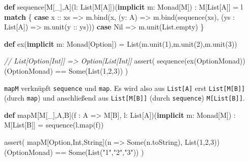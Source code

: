 \documentclass[]{article}
\newenvironment{Shaded}{}{}
\newcommand{\CommentTok}[1]{\textcolor[rgb]{0.38,0.63,0.69}{\textit{#1}}}
\newcommand{\DecValTok}[1]{\textcolor[rgb]{0.25,0.63,0.44}{#1}}
\newcommand{\FunctionTok}[1]{\textcolor[rgb]{0.02,0.16,0.49}{#1}}
\newcommand{\KeywordTok}[1]{\textcolor[rgb]{0.00,0.44,0.13}{\textbf{#1}}}
\newcommand{\NormalTok}[1]{#1}
\newcommand{\StringTok}[1]{\textcolor[rgb]{0.25,0.44,0.63}{#1}}
\begin{document}
\begin{Shaded}
\begin{Highlighting}[]
\KeywordTok{def}\NormalTok{ sequence[M[\_],A](l: List[M[A]])(}\KeywordTok{implicit}\NormalTok{ m: Monad[M]) : M[List[A]] = l }\KeywordTok{match}\NormalTok{ \{}
  \KeywordTok{case}\NormalTok{ x :: xs =\textgreater{} }
\NormalTok{      m.}\FunctionTok{bind}\NormalTok{(x, (y: A) =\textgreater{} }
\NormalTok{        m.}\FunctionTok{bind}\NormalTok{(}\FunctionTok{sequence}\NormalTok{(xs), (ys : List[A]) =\textgreater{}}
\NormalTok{          m.}\FunctionTok{unit}\NormalTok{(y :: ys)))}
  \KeywordTok{case}\NormalTok{ Nil =\textgreater{} m.}\FunctionTok{unit}\NormalTok{(List.}\FunctionTok{empty}\NormalTok{)}
\NormalTok{\}}

\KeywordTok{def} \FunctionTok{ex}\NormalTok{(}\KeywordTok{implicit}\NormalTok{ m: Monad[Option]) =}
\NormalTok{  List(m.}\FunctionTok{unit}\NormalTok{(}\DecValTok{1}\NormalTok{),m.}\FunctionTok{unit}\NormalTok{(}\DecValTok{2}\NormalTok{),m.}\FunctionTok{unit}\NormalTok{(}\DecValTok{3}\NormalTok{))}

\CommentTok{// List[Option[Int]] =\textgreater{} Option[List[Int]]}
\FunctionTok{assert}\NormalTok{( }\FunctionTok{sequence}\NormalTok{(}\FunctionTok{ex}\NormalTok{(OptionMonad))(OptionMonad) == Some(List(}\DecValTok{1}\NormalTok{,}\DecValTok{2}\NormalTok{,}\DecValTok{3}\NormalTok{)) )}
\end{Highlighting}
\end{Shaded}

\texttt{mapM} verknüpft \texttt{sequence} und \texttt{map}. Es wird also
aus \texttt{List{[}A{]}} erst \texttt{List{[}M{[}B{]}{]}} (durch
\texttt{map}) und anschließend aus \texttt{List{[}M{[}B{]}{]}} (durch
\texttt{sequence}) \texttt{M{[}List{[}B{]}{]}}.

\begin{Shaded}
\begin{Highlighting}[]
\KeywordTok{def}\NormalTok{ mapM[M[\_],A,B](f : A =\textgreater{} M[B], l: List[A])(}\KeywordTok{implicit}\NormalTok{ m: Monad[M]) : M[List[B]] =}
  \FunctionTok{sequence}\NormalTok{(l.}\FunctionTok{map}\NormalTok{(f))}

\FunctionTok{assert}\NormalTok{( mapM[Option,Int,String](n =\textgreater{} Some(n.}\FunctionTok{toString}\NormalTok{), List(}\DecValTok{1}\NormalTok{,}\DecValTok{2}\NormalTok{,}\DecValTok{3}\NormalTok{))(OptionMonad) }
\NormalTok{    == Some(List(}\StringTok{"1"}\NormalTok{,}\StringTok{"2"}\NormalTok{,}\StringTok{"3"}\NormalTok{)) )}
\end{Highlighting}
\end{Shaded}
\end{document}
